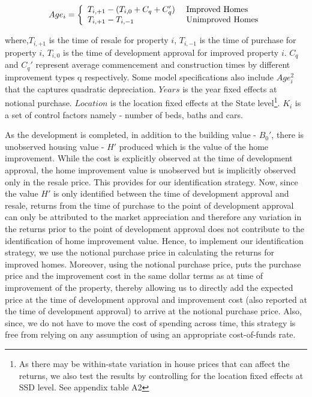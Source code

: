 \documentclass[AEJ,reqno, draftmode]{AEA} %
\begin{document}
\begin{equation}
    Age_i = \left\{
    \begin{array}{l l}
      T_{i,+1}-(T_{i,0} + C_q + C_q') & \text{ Improved Homes}\\
      T_{i,+1}-T_{i,-1}  & \text{ Unimproved Homes} \\
    \end{array} \right.
\end{equation}

where,$T_{i,+1}$ is the time of resale for property $i$, $T_{i,-1}$ is the time of purchase for property $i$, $T_{i,0}$ is the time of development approval for improved property $i$. $C_q$ and $C_q'$ represent average commencement and construction times by different improvement types q respectively. Some model specifications also include $Age_i^2$ that the captures quadratic depreciation. $Years$ is the year fixed effects at notional purchase. $Location$ is the location fixed effects at the State level\footnote{As there may be within-state variation in house prices that can affect the returns, we also test the results by controlling for the location fixed effects at SSD level. See appendix table A2}. $K_i$ is a set of control factors namely - number of beds, baths and cars.

As the development is completed, in addition to the building value - $B_0'$, there is unobserved housing value - $H'$ produced which is the value of the home improvement. While the cost is explicitly observed at the time of development approval, the home improvement value is unobserved but is implicitly observed only in the resale price. This provides for our identification strategy. Now, since the value $H'$ is only identified between the time of development approval and resale, returns from the time of purchase to the point of development approval can only be attributed to the market appreciation and therefore any variation in the returns prior to the point of development approval does not contribute to the identification of home improvement value. Hence, to implement our identification strategy, we use the notional purchase price in calculating the returns for improved homes. Moreover, using the notional purchase price, puts the purchase price and the improvement cost in the same dollar terms as at time of improvement of the property, thereby allowing us to directly add the expected price at the time of development approval and improvement cost (also reported at the time of development approval) to arrive at the notional purchase price. Also, since, we do not have to move the cost of spending across time, this strategy is free from relying on any assumption of using an appropriate cost-of-funds rate. 
\end{document}
